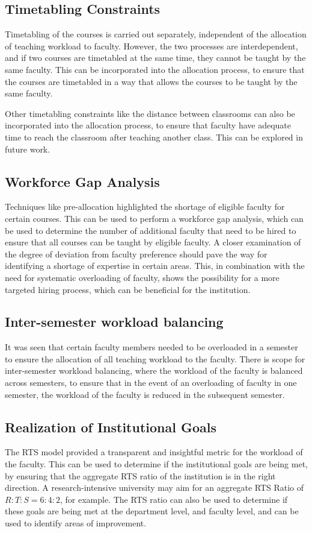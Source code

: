 \subsection{Timetabling Constraints}

Timetabling of the courses is carried out separately, independent of the allocation of teaching workload to faculty. However, the two processes are interdependent, and if two courses are timetabled at the same time, they cannot be taught by the same faculty. This can be incorporated into the allocation process, to ensure that the courses are timetabled in a way that allows the courses to be taught by the same faculty.

Other timetabling constraints like the distance between classrooms can also be incorporated into the allocation process, to ensure that faculty have adequate time to reach the classroom after teaching another class. This can be explored in future work.

\subsection{Workforce Gap Analysis}

Techniques like pre-allocation highlighted the shortage of eligible faculty for certain courses. This can be used to perform a workforce gap analysis, which can be used to determine the number of additional faculty that need to be hired to ensure that all courses can be taught by eligible faculty. A closer examination of the degree of deviation from faculty preference should pave the way for identifying a shortage of expertise in certain areas. This, in combination with the need for systematic overloading of faculty, shows the possibility for a more targeted hiring process, which can be beneficial for the institution.

\subsection{Inter-semester workload balancing}

It was seen that certain faculty members needed to be overloaded in a semester to ensure the allocation of all teaching workload to the faculty. There is scope for inter-semester workload balancing, where the workload of the faculty is balanced across semesters, to ensure that in the event of an overloading of faculty in one semester, the workload of the faculty is reduced in the subsequent semester.

\subsection{Realization of Institutional Goals}

The RTS model provided a transparent and insightful metric for the workload of the faculty. This can be used to determine if the institutional goals are being met, by ensuring that the aggregate RTS ratio of the institution is in the right direction. A research-intensive university may aim for an aggregate RTS Ratio of $R:T:S = 6:4:2$, for example. The RTS ratio can also be used to determine if these goals are being met at the department level, and faculty level, and can be used to identify areas of improvement.
